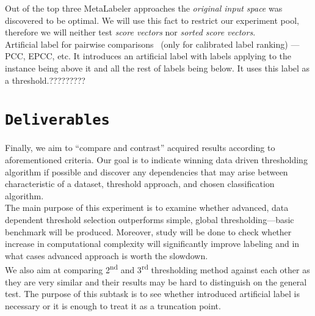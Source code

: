 \documentclass[12pt,a4paper,twocolumn]{article}
\newcommand{\ts}{\textsuperscript}
\begin{document}
Out of the top three MetaLabeler approaches the \emph{original input space} was discovered to be optimal. We will use this fact to restrict our experiment pool, therefore we will neither test \emph{score vectors} nor \emph{sorted score vectors}.\\

Artificial label for pairwise comparisons~\cite{conf/icml/DembczynskiCH10} (only for calibrated label ranking) ---PCC, EPCC, etc. It introduces an artificial label with labels applying to the instance being above it and all the rest of labels being below. It uses this label as a threshold.?????????

\section*{\texttt{Deliverables}}
Finally, we aim to ``compare and contrast'' acquired results according to aforementioned criteria. Our goal is to indicate winning data driven thresholding algorithm if possible and discover any dependencies that may arise between characteristic of a dataset, threshold approach, and chosen classification algorithm.\\

The main purpose of this experiment is to examine whether advanced, data dependent threshold selection outperforms simple, global thresholding---basic benchmark will be produced. Moreover, study will be done to check whether increase in computational complexity will significantly improve labeling and in what cases advanced approach is worth the slowdown.\\

We also aim at comparing 2\ts{nd} and 3\ts{rd} thresholding method against each other as they are very similar and their results may be hard to distinguish on the general test. The purpose of this subtask is to see whether introduced artificial label is necessary or it is enough to treat it as a truncation point.\\


{}


\end{document}
